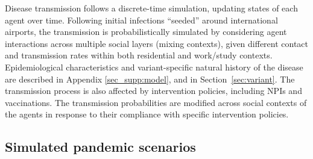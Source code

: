 \documentclass{article}
\begin{document}
Disease transmission follows a discrete-time simulation, updating states of each agent over time. Following initial infections ``seeded'' around international airports, the transmission is probabilistically simulated by considering agent interactions across multiple  social layers (mixing contexts), given different contact and transmission rates within both residential and work/study contexts. Epidemiological characteristics and variant-specific natural history of the disease are described in Appendix \ref{sec_supp:model}, and in Section~\ref{sec:variant}.
%
%
The transmission process is also affected by intervention policies, including NPIs and  vaccinations. The transmission probabilities are modified across  social contexts of the agents in response to their compliance with specific intervention policies. 

\subsection{Simulated pandemic scenarios} 
\label{sec:scenario}
\end{document}
